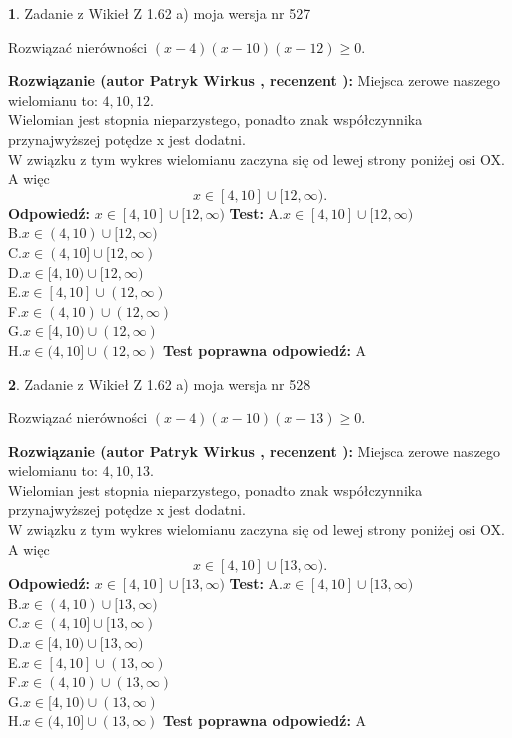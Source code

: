 \documentclass[12pt, a4paper]{article}
\theoremstyle{definition} %
\newtheorem{zad}{}
\newcommand{\zadStart}[1]{\begin{zad}#1\newline}
\newcommand{\zadStop}{\end{zad}}
\newcommand{\rozwStart}[2]{\noindent \textbf{Rozwiązanie (autor #1 , recenzent #2): }\newline}
\newcommand{\rozwStop}{\newline}
\newcommand{\odpStart}{\noindent \textbf{Odpowiedź:}\newline}
\newcommand{\odpStop}{\newline}
\newcommand{\testStart}{\noindent \textbf{Test:}\newline}
\newcommand{\testStop}{\newline}
\newcommand{\kluczStart}{\noindent \textbf{Test poprawna odpowiedź:}\newline}
\newcommand{\kluczStop}{\newline}
\begin{document}
\zadStart{Zadanie z Wikieł Z 1.62 a) moja wersja nr 527}

Rozwiązać nierówności $(x-4)(x-10)(x-12)\ge0$.
\zadStop
\rozwStart{Patryk Wirkus}{}
Miejsca zerowe naszego wielomianu to: $4, 10, 12$.\\
Wielomian jest stopnia nieparzystego, ponadto znak współczynnika przy\linebreak najwyższej potędze x jest dodatni.\\ W związku z tym wykres wielomianu zaczyna się od lewej strony poniżej osi OX. A więc $$x \in [4,10] \cup [12,\infty).$$
\rozwStop
\odpStart
$x \in [4,10] \cup [12,\infty)$
\odpStop
\testStart
A.$x \in [4,10] \cup [12,\infty)$\\
B.$x \in (4,10) \cup [12,\infty)$\\
C.$x \in (4,10] \cup [12,\infty)$\\
D.$x \in [4,10) \cup [12,\infty)$\\
E.$x \in [4,10] \cup (12,\infty)$\\
F.$x \in (4,10) \cup (12,\infty)$\\
G.$x \in [4,10) \cup (12,\infty)$\\
H.$x \in (4,10] \cup (12,\infty)$
\testStop
\kluczStart
A
\kluczStop



\zadStart{Zadanie z Wikieł Z 1.62 a) moja wersja nr 528}

Rozwiązać nierówności $(x-4)(x-10)(x-13)\ge0$.
\zadStop
\rozwStart{Patryk Wirkus}{}
Miejsca zerowe naszego wielomianu to: $4, 10, 13$.\\
Wielomian jest stopnia nieparzystego, ponadto znak współczynnika przy\linebreak najwyższej potędze x jest dodatni.\\ W związku z tym wykres wielomianu zaczyna się od lewej strony poniżej osi OX. A więc $$x \in [4,10] \cup [13,\infty).$$
\rozwStop
\odpStart
$x \in [4,10] \cup [13,\infty)$
\odpStop
\testStart
A.$x \in [4,10] \cup [13,\infty)$\\
B.$x \in (4,10) \cup [13,\infty)$\\
C.$x \in (4,10] \cup [13,\infty)$\\
D.$x \in [4,10) \cup [13,\infty)$\\
E.$x \in [4,10] \cup (13,\infty)$\\
F.$x \in (4,10) \cup (13,\infty)$\\
G.$x \in [4,10) \cup (13,\infty)$\\
H.$x \in (4,10] \cup (13,\infty)$
\testStop
\kluczStart
A
\kluczStop
\end{document}
